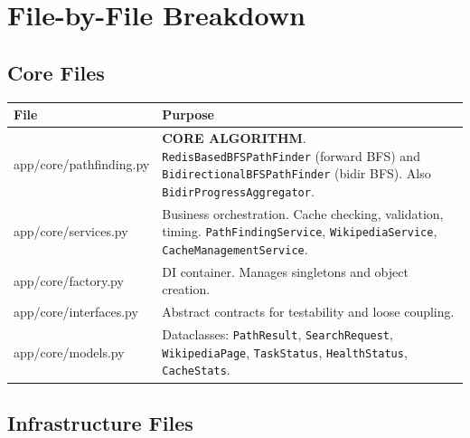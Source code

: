 \documentclass[11pt,a4paper]{article}
\begin{document}
\section{File-by-File Breakdown}

\subsection{Core Files}

\begin{tabularx}{\textwidth}{@{}>{\ttfamily}l X@{}}
\toprule
\normalfont\textbf{File} & \textbf{Purpose} \\
\midrule
app/core/pathfinding.py & \textbf{CORE ALGORITHM}. \texttt{RedisBasedBFSPathFinder} (forward BFS) and \texttt{BidirectionalBFSPathFinder} (bidir BFS). Also \texttt{BidirProgressAggregator}. \\
\addlinespace[0.3em]
app/core/services.py & Business orchestration. Cache checking, validation, timing. \texttt{PathFindingService}, \texttt{WikipediaService}, \texttt{CacheManagementService}. \\
\addlinespace[0.3em]
app/core/factory.py & DI container. Manages singletons and object creation. \\
\addlinespace[0.3em]
app/core/interfaces.py & Abstract contracts for testability and loose coupling. \\
\addlinespace[0.3em]
app/core/models.py & Dataclasses: \texttt{PathResult}, \texttt{SearchRequest}, \texttt{WikipediaPage}, \texttt{TaskStatus}, \texttt{HealthStatus}, \texttt{CacheStats}. \\
\bottomrule
\end{tabularx}

\subsection{Infrastructure Files}
\end{document}
